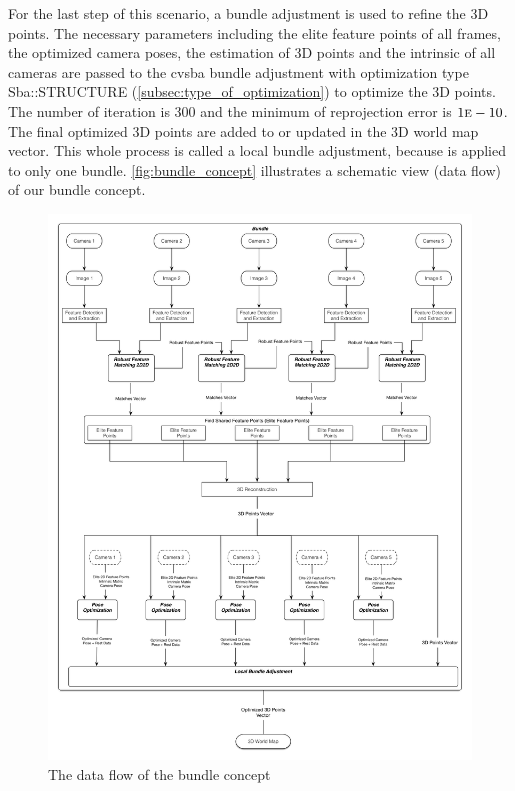 For the last step of this scenario, a bundle adjustment is used to refine the 3D points. The necessary parameters including the elite feature points of all frames, the optimized camera poses, the estimation of 3D points and the intrinsic of all cameras are passed to the cvsba bundle adjustment with optimization type Sba::STRUCTURE (\autoref{subsec:type_of_optimization}) to optimize the 3D points. The number of iteration is 300 and the minimum of reprojection error is $1\mbox{\textsc{e}}-10$. The final optimized 3D points are added to or updated in the 3D world map vector. This whole process is called a local bundle adjustment, because is applied to only one bundle. \autoref{fig:bundle_concept} illustrates a schematic view (data flow) of our bundle concept.

\begin{figure}[H]
  \centering
  \includegraphics[width=\textwidth, height=\textheight, keepaspectratio]{figures/bundle_concept}
  \caption{The data flow of the bundle concept}\label{fig:bundle_concept}
\end{figure}



